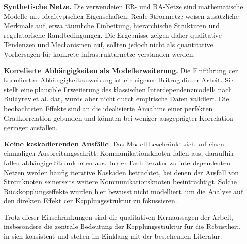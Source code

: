 \textbf{Synthetische Netze.} Die verwendeten ER- und BA-Netze sind mathematische Modelle mit idealtypischen Eigenschaften. Reale Stromnetze weisen zusätzliche Merkmale auf, etwa räumliche Einbettung, hierarchische Strukturen und regulatorische Randbedingungen. Die Ergebnisse zeigen daher qualitative Tendenzen und Mechanismen auf, sollten jedoch nicht als quantitative Vorhersagen für konkrete Infrastrukturnetze verstanden werden.

\textbf{Korrelierte Abhängigkeiten als Modellerweiterung.} Die Einführung der korrelierten Abhängigkeitszuweisung ist ein eigener Beitrag dieser Arbeit. Sie stellt eine plausible Erweiterung des klassischen Interdependenzmodells nach Buldyrev et al. dar, wurde aber nicht durch empirische Daten validiert. Die beobachteten Effekte sind an die idealisierte Annahme einer perfekten Gradkorrelation gebunden und könnten bei weniger ausgeprägter Korrelation geringer ausfallen.

\textbf{Keine kaskadierenden Ausfälle.} Das Modell beschränkt sich auf einen einmaligen Ausbreitungsschritt: Kommunikationsknoten fallen aus, daraufhin fallen abhängige Stromknoten aus. In der Fachliteratur zu interdependenten Netzen werden häufig iterative Kaskaden betrachtet, bei denen der Ausfall von Stromknoten seinerseits weitere Kommunikationsknoten beeinträchtigt. Solche Rückkopplungseffekte wurden hier bewusst nicht modelliert, um die Analyse auf den direkten Effekt der Kopplungsstruktur zu fokussieren.

Trotz dieser Einschränkungen sind die qualitativen Kernaussagen der Arbeit, insbesondere die zentrale Bedeutung der Kopplungsstruktur für die Robustheit, in sich konsistent und stehen im Einklang mit der bestehenden Literatur.
